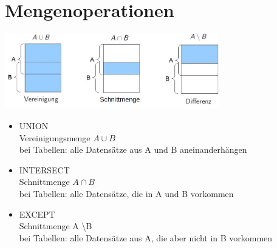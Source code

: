 \documentclass{scrreprt}
\newcommand\tab[1][1cm]{\hspace*{#1}}
\begin{document}
\section{Mengenoperationen}
\includegraphics[width=0.7\textwidth]{"graphics/MengenOP"}
\begin{itemize}
  \item UNION
  \\\tab Vereinigungsmenge $A \cup B$
  \\\tab bei Tabellen: alle Datensätze aus A und B aneinanderhängen
  \item INTERSECT
  \\\tab Schnittmenge $A \cap B$
  \\\tab bei Tabellen: alle Datensätze, die in A und B vorkommen
  \item EXCEPT
  \\\tab Schnittmenge A \textbackslash B
  \\\tab bei Tabellen: alle Datensätze aus A, die aber nicht in B vorkommen
\end{itemize}
\end{document}
